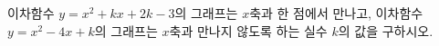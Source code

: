 이차함수 $y=x^2+kx+2k-3$의 그래프는 $x$축과 한 점에서 만나고, 이차함수 $y=x^2-4x+k$의 그래프는 $x$축과 만나지 않도록 하는 실수 $k$의 값을 구하시오.
